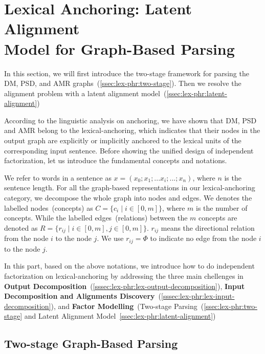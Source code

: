 \section[Lexical Anchoring: Latent Alignment Model for Graph-Based
Parsing]{Lexical Anchoring: Latent Alignment \\Model for Graph-Based Parsing}
\label{sec:lex-phr:graph-based}

In this section, we will first introduce the two-stage framework for parsing
the DM, PSD, and AMR graphs~(\autoref{ssec:lex-phr:two-stage}). Then we
resolve the alignment problem with a latent alignment model~(\autoref{ssec:lex-phr:latent-alignment})


According to the linguistic analysis on anchoring, we have shown that
DM, PSD and AMR belong to the lexical-anchoring, which indicates that
their nodes in the output graph are explicitly or implicitly anchored
to the lexical units of the corresponding input sentence.  Before
showing the unified design of independent factorization, let us
introduce the fundamental concepts and notations.

We refer to words in a sentence as
$x=(x_{0};x_{1};...x_{i};...;x_{n})$, where $n$ is the sentence
length.  For all the graph-based representations in our
lexical-anchoring category, we decompose the whole graph into nodes
and edges. We denotes the labelled nodes~(concepts) as
$C = \{c_{i}\mid i \in [0,m]\}$, where $m$ is the number of concepts.
While the labelled edges~(relations) between the $m$ concepts are
denoted as $R = \{r_{ij}\mid i \in [0, m], j \in [0, m]\}$.  $r_{ij}$ means
the directional relation from the node $i$ to the node $j$.  We use
$r_{ij}=\Phi$ to indicate no edge from the node $i$ to the node $j$.

In this part, based on the above notations, we introduce how to do
independent factorization on lexical-anchoring by addressing the three
main chellenges in \textbf{Output
  Decomposition}~(\autoref{sssec:lex-phr:lex-output-decomposition}),
\textbf{Input Decomposition and Alignments
  Discovery}~(\autoref{sssec:lex-phr:lex-input-decomposition}), and
\textbf{Factor Modelling}~(Two-stage
Parsing~(\autoref{ssec:lex-phr:two-stage} and Latent Alignment
Model~\autoref{ssec:lex-phr:latent-alignment})



\subsection{Two-stage Graph-Based Parsing}
\label{ssec:lex-phr:two-stage}


